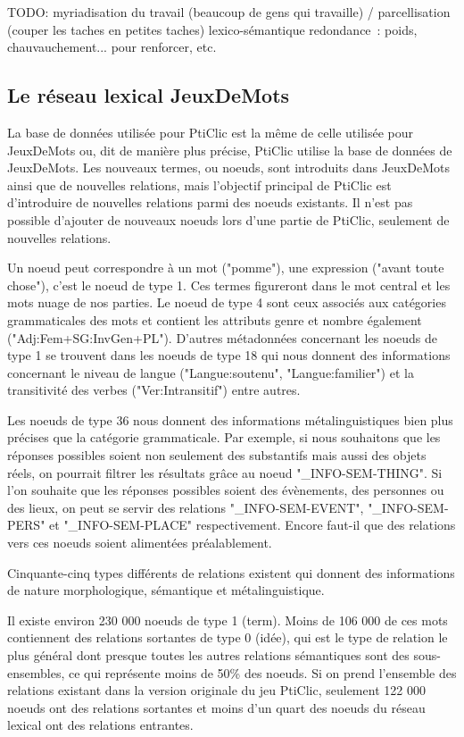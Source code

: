 \documentclass[a4paper,11pt,french]{article}
\begin{document}
TODO: 
myriadisation du travail (beaucoup de gens qui travaille)
 / parcellisation (couper les taches en petites taches)
lexico-sémantique
redondance~: poids, chauvauchement... pour renforcer, etc.
 



\subsection{Le réseau lexical JeuxDeMots}

La base de données utilisée pour PtiClic est la même de celle utilisée pour JeuxDeMots ou, dit de manière plus précise, PtiClic utilise la base de données de JeuxDeMots. Les nouveaux termes, ou noeuds, sont introduits dans JeuxDeMots ainsi que de nouvelles relations, mais l'objectif principal de PtiClic est d'introduire de nouvelles relations parmi des noeuds existants. Il n'est pas possible d'ajouter de nouveaux noeuds lors d'une partie de PtiClic, seulement de nouvelles relations. 

Un noeud peut correspondre à un mot ("pomme"), une expression ("avant toute chose"), c'est le noeud de type 1. Ces termes figureront dans le mot central et les mots nuage de nos parties. Le noeud de type 4 sont ceux associés aux catégories grammaticales des mots et contient les attributs genre et nombre également ("Adj:Fem+SG:InvGen+PL"). D'autres métadonnées concernant les noeuds de type 1 se trouvent dans les noeuds de type 18 qui nous donnent des informations concernant le niveau de langue ("Langue:soutenu", "Langue:familier") et la transitivité des verbes ("Ver:Intransitif") entre autres.

Les noeuds de type 36 nous donnent des informations métalinguistiques bien plus précises que la catégorie grammaticale. Par exemple, si nous souhaitons que les réponses possibles soient non seulement des substantifs mais aussi des objets réels, on pourrait filtrer les résultats grâce au noeud "\_INFO-SEM-THING". Si l'on souhaite que les réponses possibles soient des évènements, des personnes ou des lieux, on peut se servir des relations "\_INFO-SEM-EVENT", "\_INFO-SEM-PERS" et "\_INFO-SEM-PLACE" respectivement. Encore faut-il que des relations vers ces noeuds soient alimentées préalablement. 

Cinquante-cinq types différents de relations existent qui donnent des informations de nature morphologique, sémantique et métalinguistique. 

Il existe environ 230 000 noeuds de type 1 (term). Moins de 106 000 de ces mots contiennent des relations sortantes de type 0 (idée), qui est le type de relation le plus général dont presque toutes les autres relations sémantiques sont des sous-ensembles, ce qui représente moins de 50\% des noeuds. Si on prend l'ensemble des relations existant dans la version originale du jeu PtiClic, seulement 122 000 noeuds ont des relations sortantes et moins d'un quart des noeuds du réseau lexical ont des relations entrantes. 
\end{document}
